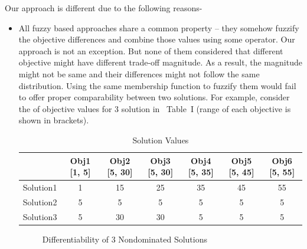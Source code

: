 \documentclass[journal]{IEEEtran}
\begin{document}
Our approach is different due to the following reasons-

\begin{itemize}
\item All fuzzy based approaches share a common property – they somehow fuzzify the objective differences and combine those values using some operator. Our approach is not an exception. But none of them considered that different objective might have different trade-off magnitude. As a result, the magnitude might not be same and their differences might not follow the same distribution. Using the same membership function to fuzzify them would fail to offer proper comparability between two solutions. For example, consider the  of objective values for 3 solution in ~{Table~I} (range of each objective is shown in brackets).


\begin{table}%
\begin{center}
\caption{Solution Values}
\begin{tabular}{| c | c | c | c | c | c | c |}
\hline
&\textbf{Obj1 [1, 5]} & \textbf{Obj2 [5, 30]} & \textbf{Obj3 [5, 30]} & \textbf{Obj4 [5, 35]} & \textbf{Obj5 [5, 45]} & \textbf{Obj6 [5, 55]}\\
\hline

Solution1 & 1 & 15 & 25 & 35 & 45 & 55 \\
\hline

Solution2 & 5 & 5 & 5 & 5 & 5 & 5 \\
\hline

Solution3 & 5 & 30 & 30 & 5 & 5 & 5 \\
\hline

\end{tabular}
\end{center}
\label{table_spiderplot}
\end{table}


\begin{figure}[!t]
\centering
{}
\caption{Differentiability of 3 Nondominated Solutions}
\label{spiderplot}
\end{figure}



\end{itemize}
\end{document}
